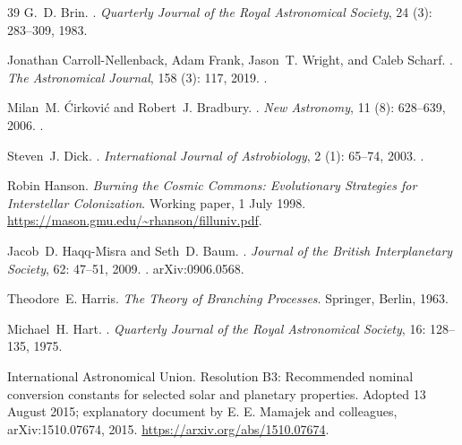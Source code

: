 \documentclass[11pt,a4paper]{article}
\theoremstyle{definition}\newtheorem{definition}{Definition}
\begin{document}
\begin{thebibliography}{39}
G.~D. Brin.
.
\newblock \emph{Quarterly Journal of the Royal Astronomical Society},
  24 (3): 283--309, 1983.

Jonathan Carroll-Nellenback, Adam Frank, Jason~T. Wright, and Caleb Scharf.
.
\newblock \emph{The Astronomical Journal}, 158 (3): 117,
  2019.
\newblock {}.

Milan~M. \'Cirkovi\'c and Robert~J. Bradbury.
.
\newblock \emph{New Astronomy}, 11 (8): 628--639, 2006.
\newblock {}.

Steven~J. Dick.
.
\newblock \emph{International Journal of Astrobiology}, 2
  (1): 65--74, 2003.
\newblock {}.

Robin Hanson.
\newblock \emph{Burning the Cosmic Commons: Evolutionary Strategies for
Interstellar Colonization}.
\newblock Working paper, 1 July 1998.
\newblock \url{https://mason.gmu.edu/~rhanson/filluniv.pdf}.

Jacob~D. Haqq-Misra and Seth~D. Baum.
.
\newblock \emph{Journal of the British Interplanetary Society}, 62:
  47--51, 2009.
\newblock {}.
\newblock arXiv:0906.0568.

Theodore~E. Harris.
\newblock \emph{{The Theory of Branching Processes}}.
\newblock Springer, Berlin, 1963.

Michael~H. Hart.
.
\newblock \emph{Quarterly Journal of the Royal Astronomical Society},
  16: 128--135, 1975.

International Astronomical Union.
\newblock Resolution B3: Recommended nominal conversion constants for
selected solar and planetary properties.
\newblock Adopted 13 August 2015; explanatory document by E. E. Mamajek
and colleagues, arXiv:1510.07674, 2015.
\newblock \url{https://arxiv.org/abs/1510.07674}.


\end{thebibliography}
\end{document}

